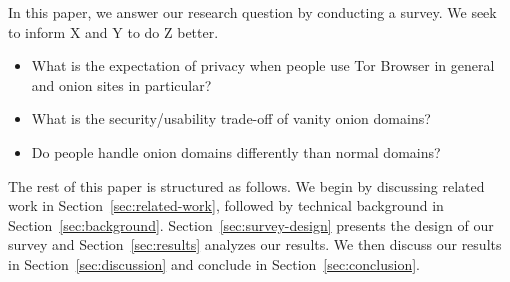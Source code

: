 In this paper, we answer our research question by conducting a survey.
We seek to inform X and Y to do Z better.

\begin{itemize}
    \item What is the expectation of privacy when people use Tor Browser in
        general and onion sites in particular?
    \item What is the security/usability trade-off of vanity onion domains?
    \item Do people handle onion domains differently than normal domains?
\end{itemize}

The rest of this paper is structured as follows.  We begin by discussing related
work in Section~\ref{sec:related-work}, followed by technical background in
Section~\ref{sec:background}.  Section~\ref{sec:survey-design} presents the
design of our survey and Section~\ref{sec:results} analyzes our results.  We
then discuss our results in Section~\ref{sec:discussion} and conclude in
Section~\ref{sec:conclusion}.
